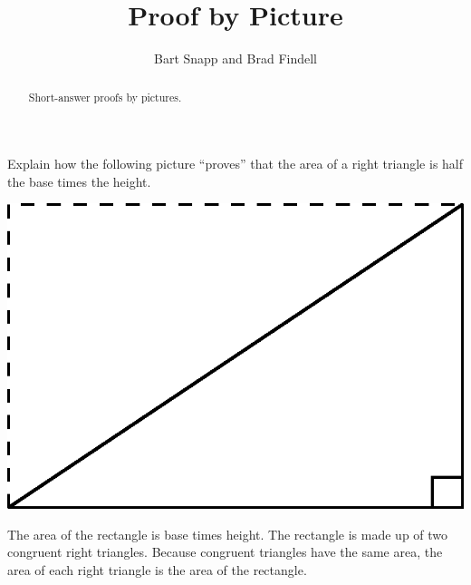 \documentclass[nooutcomes]{ximera}
\title{Proof by Picture}
\author{Bart Snapp and Brad Findell}
\begin{document}
\begin{abstract}
Short-answer proofs by pictures. 
\end{abstract}
\maketitle


\begin{problem}
Explain how the following picture ``proves'' that
  the area of a right triangle is half the base times the height.
\begin{image}
\includegraphics{pbpAreaRight.png}
\end{image}
\begin{freeResponse}
\begin{hint}
The area of the rectangle is base times height.  The rectangle is made up of two congruent right triangles.  Because congruent triangles have the same area, the area of each right triangle is  the area of the rectangle.  
\end{hint}
\end{freeResponse}
\end{problem}
\end{document}
